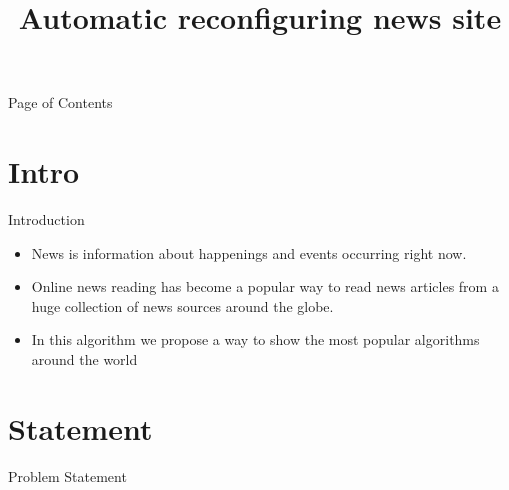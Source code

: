 \documentclass{beamer}
\title{Automatic reconfiguring news site}
\begin{document}
	\begin{frame}{Page of Contents}
		\tableofcontents
	\end{frame}
	\section{Intro}
	\begin{frame}{Introduction}
		\begin{itemize}
			\item  News is information about happenings and events occurring right now.
			\item Online news reading has become a popular way to read news articles from a huge collection of news sources around the globe.
			\item In this algorithm we propose a way to show the most popular algorithms around the world
		\end{itemize}
	\end{frame}
	\section{Statement}
	\begin{frame}{Problem Statement}
		
	\end{frame}
\end{document}
